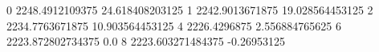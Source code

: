 0 2248.4912109375 24.618408203125
1 2242.9013671875 19.028564453125
2 2234.7763671875 10.903564453125
4 2226.4296875 2.556884765625
6 2223.872802734375 0.0
8 2223.603271484375 -0.26953125

